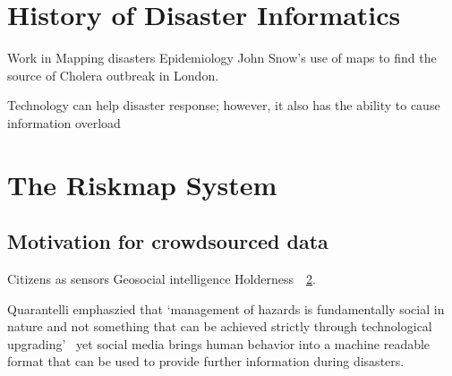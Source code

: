 \section{History of Disaster Informatics}
Work in Mapping disasters
Epidemiology John Snow's use of maps to find the source of Cholera outbreak in
London\cite{rogersJohnSnowData2013}.

Technology can help disaster response; however, it also has the ability to cause
information overload\cite{tierneyFacingUnexpectedDisaster2001}



\section{The Riskmap System}\label{ch1:riskmap}


\subsection{Motivation for crowdsourced data}
Citizens as sensors
Geosocial intelligence
Holderness~\cite{holdernessSocialMediaGeoSocial2015a}~\ref{ch1:riskmap}.

Quarantelli emphaszied that  `management of hazards is fundamentally social in
nature and not something that can be achieved strictly through technological
upgrading'~\cite{tierneyFacingUnexpectedDisaster2001} yet social media brings
human behavior into a machine readable format that can be used to provide
further information during disasters.


\subsection{}

